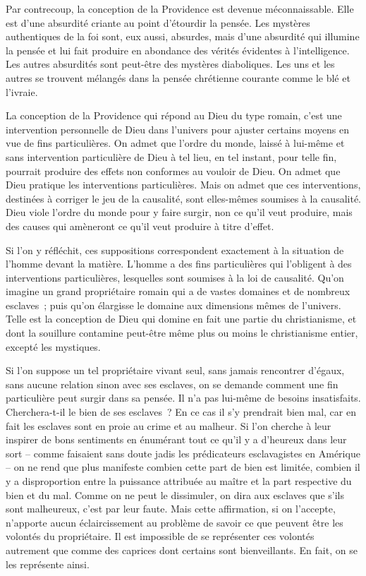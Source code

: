 \documentclass[french,twoside]{book} %
\begin{document}
Par contrecoup, la conception de la Providence est devenue méconnaissable. Elle est d'une absurdité criante au point d'étourdir la pensée. Les mystères authentiques de la foi sont, eux aussi, absurdes, mais d'une absurdité qui illumine la pensée et lui fait produire en abondance des vérités évidentes à l'intelligence. Les autres absurdités sont peut-être des mystères diaboliques. Les uns et les autres se trouvent mélangés dans la pensée chrétienne courante comme le blé et l'ivraie.\par
La conception de la Providence qui répond au Dieu du type romain, c'est une intervention personnelle de Dieu dans l'univers pour ajuster certains moyens en vue de fins particulières. On admet que l'ordre du monde, laissé à lui-même et sans intervention particulière de Dieu à tel lieu, en tel instant, pour telle fin, pourrait produire des effets non conformes au vouloir de Dieu. On admet que Dieu pratique les interventions particulières. Mais on admet que ces interventions, destinées à corriger le jeu de la causalité, sont elles-mêmes soumises à la causalité. Dieu viole l'ordre du monde pour y faire surgir, non ce qu'il veut produire, mais des causes qui amèneront ce qu'il veut produire à titre d'effet.\par
Si l'on y réfléchit, ces suppositions correspondent exactement à la situation de l'homme devant la matière. L'homme a des fins particulières qui l'obligent à des interventions particulières, lesquelles sont soumises à la loi de causalité. Qu'on imagine un grand propriétaire romain qui a de vastes domaines et de nombreux esclaves ; puis qu'on élargisse le domaine aux dimensions mêmes de l'univers. Telle est la conception de Dieu qui domine en fait une partie du christianisme, et dont la souillure contamine peut-être même plus ou moins le christianisme entier, excepté les mystiques.\par
Si l'on suppose un tel propriétaire vivant seul, sans jamais rencontrer d'égaux, sans aucune relation sinon avec ses esclaves, on se demande comment une fin particulière peut surgir dans sa pensée. Il n'a pas lui-même de besoins insatisfaits. Cherchera-t-il le bien de ses esclaves ? En ce cas il s'y prendrait bien mal, car en fait les esclaves sont en proie au crime et au malheur. Si l'on cherche à leur inspirer de bons sentiments en énumérant tout ce qu'il y a d'heureux dans leur sort – comme faisaient sans doute jadis les prédicateurs esclavagistes en Amérique – on ne rend que plus manifeste combien cette part de bien est limitée, combien il y a disproportion entre la puissance attribuée au maître et la part respective du bien et du mal. Comme on ne peut le dissimuler, on dira aux esclaves que s'ils sont malheureux, c'est par leur faute. Mais cette affirmation, si on l'accepte, n'apporte aucun éclaircissement au problème de savoir ce que peuvent être les volontés du propriétaire. Il est impossible de se représenter ces volontés autrement que comme des caprices dont certains sont bienveillants. En fait, on se les représente ainsi.\par
\end{document}
